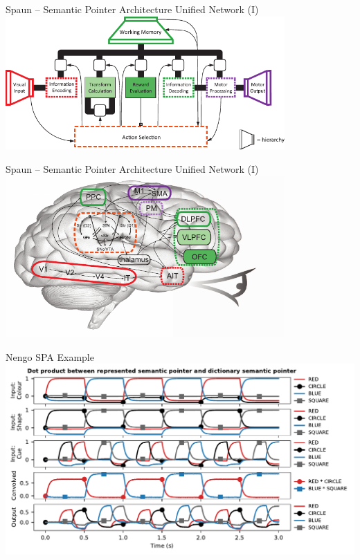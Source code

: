 \documentclass[handout,aspectratio=169]{beamer}
\begin{document}
	\begin{frame}{Spaun -- Semantic Pointer Architecture Unified Network (I)}
		\centering
		\includegraphics[width=0.8\textwidth]{media/eliasmith_2012_spaun_architecture.pdf}
	\end{frame}
	
	\begin{frame}{Spaun -- Semantic Pointer Architecture Unified Network (I)}
		\centering
		\includegraphics[width=0.8\textwidth]{media/eliasmith_2012_spaun_anatomy.pdf}
	\end{frame}

	\begin{frame}{Nengo SPA Example}
		\centering
		\includegraphics[width=\textwidth]{media/nengo_spa_example.pdf}
	\end{frame}
\end{document}
